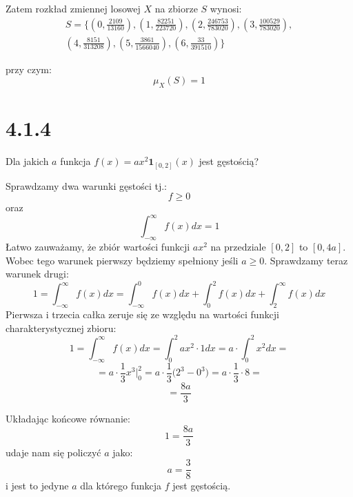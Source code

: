 \documentclass{article}
\begin{document}
Zatem rozkład zmiennej losowej \(X\) na zbiorze \(S\) wynosi:
\begin{align*} 
    S = \Big\{(0, \frac{2109}{13160}), (1, \frac{82251}{223720}), (2, \frac{246753}{783020}), (3, \frac{100529}{783020}), \\
             (4, \frac{8151}{313208}), (5, \frac{3861}{1566040}), (6, \frac{33}{391510})\Big\}
\end{align*}

przy czym:
\begin{equation*}
    \mu_{X}(S) = 1
\end{equation*}

\section*{4.1.4}

\begin{center}
    Dla jakich \(a\) funkcja \(f(x) = ax^{2}\mathbf{1}_{[0,2]}(x)\) jest gęstością?
\end{center}

Sprawdzamy dwa warunki gęstości tj.:
\begin{equation*}
    f \geq 0
\end{equation*}
oraz
\begin{equation*}
    \int_{-\infty}^{\infty} f(x)dx = 1
\end{equation*}
Łatwo zauważamy, że zbiór wartości funkcji \(ax^2\) na przedziale \([0,2]\) to \([0, 4a]\).
Wobec tego warunek pierwszy będziemy spełniony jeśli \(a \geq 0\). Sprawdzamy teraz warunek drugi:
\begin{equation*}
    1 = \int_{-\infty}^{\infty} f(x)dx = \int_{-\infty}^{0} f(x)dx + \int_{0}^{2} f(x)dx + \int_{2}^{\infty} f(x)dx
\end{equation*}
Pierwsza i trzecia całka zeruje się ze względu na wartości funkcji charakterystycznej zbioru:
\begin{equation*}
    1 = \int_{-\infty}^{\infty} f(x)dx = \int_{0}^{2} ax^{2} \cdot 1 dx = a \cdot \int_{0}^{2} x^{2} dx = 
\end{equation*}
\begin{equation*}
    = a \cdot \frac{1}{3}x^{3} \Bigg\rvert_{0}^{2} = a \cdot \frac{1}{3}\Bigg(2^{3} - 0^{3}\Bigg) = a \cdot \frac{1}{3} \cdot 8 =
\end{equation*}
\begin{equation*}
    = \frac{8a}{3}
\end{equation*}

Układając końcowe równanie:
\begin{equation*}
    1 = \frac{8a}{3}
\end{equation*}
udaje nam się policzyć \(a\) jako:
\begin{equation*}
    a = \frac{3}{8}
\end{equation*}
i jest to jedyne \(a\) dla którego funkcja \(f\) jest gęstością.
\end{document}
